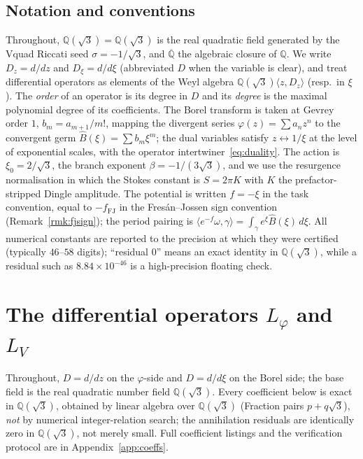\documentclass[11pt,reqno]{amsart}
\renewcommand{\_}{\vquadorigunderscore\allowbreak}
\theoremstyle{plain}
\theoremstyle{definition}
\newcommand{\Bhat}{\widehat{B}}
\newcommand{\Lphi}{L_{\varphi}}
\newcommand{\LV}{L_{V}}
\newcommand{\Qsqrt}{\mathbb{Q}(\sqrt3)}
\newcommand{\Qbar}{\overline{\mathbb{Q}}}
\newcommand{\xizero}{\xi_0}
\begin{document}
\subsection{Notation and conventions}
Throughout, $\Qsqrt=\mathbb{Q}(\sqrt3)$ is the real quadratic field generated by the V\_quad
Riccati seed $\sigma=-1/\sqrt3$, and $\Qbar$ the algebraic closure of $\mathbb{Q}$. We write
$D_z=d/dz$ and $D_\xi=d/d\xi$ (abbreviated $D$ when the variable is clear), and treat differential
operators as elements of the Weyl algebra $\Qsqrt\langle z,D_z\rangle$ (resp.\ in $\xi$). The
\emph{order} of an operator is its degree in $D$ and its \emph{degree} is the maximal polynomial
degree of its coefficients. The Borel transform is taken at Gevrey order $1$, $b_m=a_{m+1}/m!$,
mapping the divergent series $\varphi(z)=\sum a_nz^n$ to the convergent germ
$\Bhat(\xi)=\sum b_m\xi^m$; the dual variables satisfy $z\leftrightarrow1/\xi$ at the level of
exponential scales, with the operator intertwiner~\eqref{eq:duality}. The action is
$\xizero=2/\sqrt3$, the branch exponent $\beta=-1/(3\sqrt3)$, and we use the resurgence
normalisation in which the Stokes constant is $S=2\pi K$ with $K$ the prefactor-stripped Dingle
amplitude. The potential is written $f=-\xi$ in the task convention, equal to $-f_{\mathrm{FJ}}$ in
the Fres\'an--Jossen sign convention (Remark~\ref{rmk:fjsign}); the period pairing is
$\langle e^{-f}\omega,\gamma\rangle=\int_\gamma e^{\xi}\Bhat(\xi)\,d\xi$. All numerical constants
are reported to the precision at which they were certified (typically $46$--$58$ digits);
``residual $0$'' means an exact identity in $\Qsqrt$, while a residual such as
$8.84\times10^{-46}$ is a high-precision floating check.

\section{The differential operators \texorpdfstring{$\Lphi$}{Lphi} and \texorpdfstring{$\LV$}{LV}}\label{sec:operators}

Throughout, $D=d/dz$ on the $\varphi$-side and $D=d/d\xi$ on the Borel side; the base field is
the real quadratic number field $\Qsqrt$. Every coefficient below is exact in $\Qsqrt$, obtained
by linear algebra over $\Qsqrt$ (Fraction pairs $p+q\sqrt3$), \emph{not} by numerical
integer-relation search; the annihilation residuals are identically zero in $\Qsqrt$, not merely
small. Full coefficient listings and the verification protocol are in
Appendix~\ref{app:coeffs}.
\end{document}

